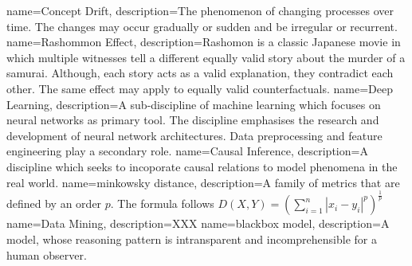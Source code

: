 {
        name=Concept Drift,
        description={The phenomenon of changing processes over time. The changes may occur gradually or sudden and be irregular or recurrent.}
}
{
        name=Rashommon Effect,
        description={Rashomon is a classic Japanese movie in which multiple witnesses tell a different equally valid story about the murder of a samurai. Although, each story acts as a valid explanation, they contradict each other. The same effect may apply to equally valid counterfactuals.}
}
{
        name=Deep Learning,
        description={A sub-discipline of machine learning which focuses on neural networks as primary tool. The discipline emphasises the research and development of neural network architectures. Data preprocessing and feature engineering play a secondary role.}
}
{
        name=Causal Inference,
        description={A discipline which seeks to incoporate causal relations to model phenomena in the real world.}
}
{
        name=minkowsky distance,
        description={A family of metrics that are defined by an order $p$. The formula follows $D(X, Y)=\left(\sum_{i=1}^{n}\left|x_{i}-y_{i}\right|^{p}\right)^{\frac{1}{p}}$}
}
{
        name=Data Mining,
        description={XXX}
}
{
        name=blackbox model,
        description={A model, whose reasoning pattern is intransparent and incomprehensible for a human observer.}
}
